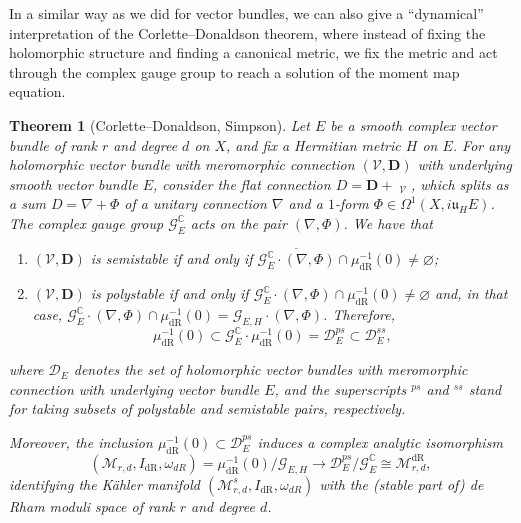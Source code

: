 \documentclass[12pt,a4paper]{amsbook}
\newtheorem{thm}{Theorem}[chapter]
\theoremstyle{remark} \newtheorem{rmk}[thm]{Remark}
\theoremstyle{definition} \newtheorem{defn}[thm]{Definition}
\theoremstyle{definition} \newtheorem{ex}[thm]{Example}
\theoremstyle{definition} \newtheorem{ej}{Exercise}
\newcommand{\C}{\mathbb C}
\newcommand{\cD}{\mathcal D}
\newcommand{\cG}{\mathcal G}
\newcommand{\cM}{\mathcal M}
\newcommand{\fu}{\mathfrak u}
\newcommand{\sV}{\mathscr V}
\newcommand{\dR}{\mathrm{dR}}
\DeclareMathOperator{\delbar}{\bar{\partial}}
\begin{document}
In a similar way as we did for vector bundles, we can also give a ``dynamical'' interpretation of the Corlette--Donaldson theorem, where instead of fixing the holomorphic structure and finding a canonical metric, we fix the metric and act through the complex gauge group to reach a solution of the moment map equation.

\begin{thm}[Corlette--Donaldson, Simpson]
Let $E$ be a smooth complex vector bundle of rank $r$ and degree $d$ on $X$, and fix a Hermitian metric $H$ on $E$.
For any holomorphic vector bundle with meromorphic connection $(\sV,\bm{D})$ with underlying smooth vector bundle $E$, consider the flat connection $D=\bm{D}+\delbar_{\sV}$, which splits as a sum $D=\nabla+\Phi$ of a unitary connection $\nabla$ and a $1$-form $\Phi\in \Omega^1(X,i\fu_H E)$. The complex gauge group $\cG^{\C}_E$ acts on the pair $(\nabla,\Phi)$.
We have that
    \begin{enumerate}
\item $(\sV,\bm{D})$ is semistable if and only if $\overline{\cG^\C_E \cdot (\nabla,\Phi)} \cap \mu_{\dR}^{-1}(0)\neq \varnothing$;
\item $(\sV,\bm{D})$ is polystable if and only if $\cG^\C_E\cdot (\nabla,\Phi) \cap \mu_{\dR}^{-1}(0)\neq \varnothing$ and, in that case, $\cG^\C_E\cdot (\nabla,\Phi) \cap \mu_{\dR}^{-1}(0)=\cG_{E,H} \cdot (\nabla,\Phi)$. Therefore,
            \begin{equation*}
\mu_{\dR}^{-1}(0) \subset \cG^\C_E \cdot \mu_{\dR}^{-1}(0) = \cD_E^{ps} \subset \cD_E^{ss},
            \end{equation*}
    \end{enumerate}
    where $\cD_E$ denotes the set of holomorphic vector bundles with meromorphic connection with underlying vector bundle $E$, and the superscripts $^{ps}$ and $^{ss}$ stand for taking subsets of polystable and semistable pairs, respectively.

Moreover, the inclusion $\mu_{\dR}^{-1}(0)\subset \cD_E^{ps}$ induces a complex analytic isomorphism
           \begin{equation*}
(\cM_{r,d},I_{\dR},\omega_{dR})=\mu_{\dR}^{-1}(0)/\cG_{E,H} \longrightarrow \cD_E^{ps}/\cG_E^\C \cong \cM^{\dR}_{r,d},
           \end{equation*}
           identifying the Kähler manifold $(\cM^s_{r,d},I_{\dR},\omega_{dR})$ with the (stable part of) de Rham moduli space of rank $r$ and degree $d$.
\end{thm}
\end{document}
